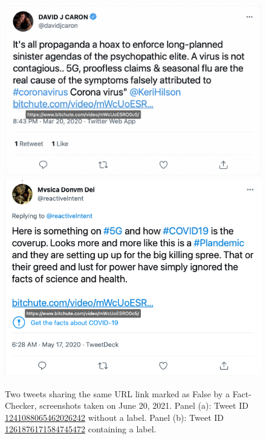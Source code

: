 \documentclass{article}
\begin{document}
\begin{figure}
\centering
		\includegraphics[scale=0.35]{./img/tweets/Capture_2021-06-30_2.png}
		\includegraphics[scale=0.35]{./img/tweets/Capture_2021-06-30.png}
	\caption{Two tweets sharing the same URL link marked as False by a Fact-Checker, screenshots taken on June 20, 2021. Panel (a): Tweet ID \href{https://twitter.com/davidjcaron/status/1241088065462026242}{1241088065462026242} without a label. Panel (b): Tweet ID \href{https://twitter.com/reactiveIntent/status/1261876171584745472}{1261876171584745472} containing a label.}
	\label{fig8}
\end{figure}
\end{document}
